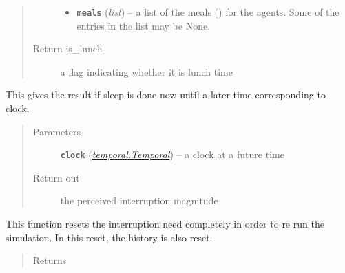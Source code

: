 \documentclass[letterpaper,10pt,english]{sphinxmanual}
\begin{document}
\begin{fulllineitems}
\begin{fulllineitems}
\begin{quote}
\begin{description}
\begin{itemize}
\item {} 
\textbf{\texttt{meals}} (\emph{list}) -- a list of the meals ({\hyperref[meal:meal.Meal]{\emph{}}}) for the agents. Some of the entries in the list         may be None.

\end{itemize}

\item[{Return is\_lunch}] \leavevmode
a flag indicating whether it is lunch time

\end{description}\end{quote}

\end{fulllineitems}


\begin{fulllineitems}
\label{interruption:interruption.Interruption.perceive}
This gives the result if sleep is done now until a later time corresponding to clock.
\begin{quote}\begin{description}
\item[{Parameters}] \leavevmode
\textbf{\texttt{clock}} ({\hyperref[temporal:temporal.Temporal]{\emph{\emph{temporal.Temporal}}}}) -- a clock at a future time

\item[{Return out}] \leavevmode
the perceived interruption magnitude

\end{description}\end{quote}

\end{fulllineitems}


\begin{fulllineitems}
\label{interruption:interruption.Interruption.reset}
This function resets the interruption need completely in order to re run the simulation. In this reset,         the history is also reset.
\begin{quote}\begin{description}
\item[{Returns}] \leavevmode


\end{description}\end{quote}


\end{fulllineitems}
\end{fulllineitems}
\end{document}
